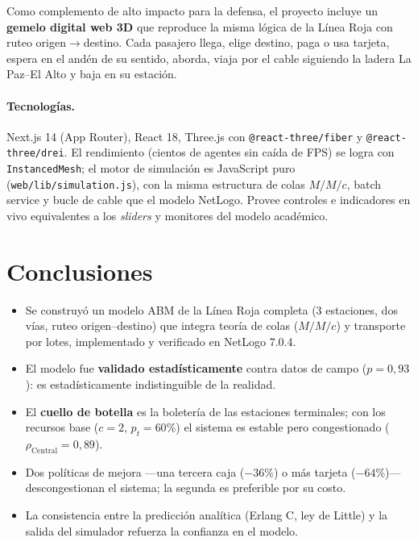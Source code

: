 \documentclass[11pt,a4paper]{article}
\newcommand{\code}[1]{\texttt{#1}}
\begin{document}
Como complemento de alto impacto para la defensa, el proyecto incluye un
\textbf{gemelo digital web 3D} que reproduce la misma lógica de la Línea Roja con
ruteo origen$\to$destino. Cada pasajero llega, elige destino, paga o usa tarjeta,
espera en el andén de su sentido, aborda, viaja por el cable siguiendo la ladera
La Paz--El Alto y baja en su estación.

\paragraph{Tecnologías.} Next.js 14 (App Router), React 18, Three.js con
\code{@react-three/fiber} y \code{@react-three/drei}. El rendimiento (cientos de
agentes sin caída de FPS) se logra con \code{InstancedMesh}; el motor de simulación
es JavaScript puro (\code{web/lib/simulation.js}), con la misma estructura de colas
$M/M/c$, batch service y bucle de cable que el modelo NetLogo. Provee controles e
indicadores en vivo equivalentes a los \emph{sliders} y monitores del modelo
académico.

\section{Conclusiones}
\begin{itemize}[nosep]
  \item Se construyó un modelo ABM de la Línea Roja completa (3 estaciones, dos
  vías, ruteo origen--destino) que integra teoría de colas ($M/M/c$) y transporte
  por lotes, implementado y verificado en NetLogo 7.0.4.
  \item El modelo fue \textbf{validado estadísticamente} contra datos de campo
  ($p=0{,}93$): es estadísticamente indistinguible de la realidad.
  \item El \textbf{cuello de botella} es la boletería de las estaciones terminales;
  con los recursos base ($c=2$, $p_t=60\%$) el sistema es estable pero congestionado
  ($\rho_{\text{Central}}=0{,}89$).
  \item Dos políticas de mejora ---una tercera caja ($-36\%$) o más tarjeta
  ($-64\%$)--- descongestionan el sistema; la segunda es preferible por su costo.
  \item La consistencia entre la predicción analítica (Erlang C, ley de Little) y la
  salida del simulador refuerza la confianza en el modelo.
\end{itemize}
\end{document}
